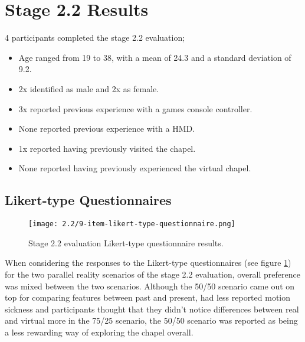 
\section{Stage 2.2 Results}

4 participants completed the stage 2.2 evaluation;
\begin{itemize}
	\item Age ranged from 19 to 38, with a mean of 24.3 and a standard deviation of 9.2.
	\item 2x identified as male and 2x as female.
	\item 3x reported previous experience with a games console controller.
	\item None reported previous experience with a HMD.
	\item 1x reported having previously visited the chapel.
	\item None reported having previously experienced the virtual chapel.
\end{itemize}


\subsection{Likert-type Questionnaires}

\begin{figure}[h]
	\begin{center}
	\texttt{[image: 2.2/9-item-likert-type-questionnaire.png]}
	\caption{Stage 2.2 evaluation Likert-type questionnaire results.}
	\label{9-item-likert-type-questionnaire.png}
	\end{center}
\end{figure}

When considering the responses to the Likert-type questionnaires (see figure \ref{9-item-likert-type-questionnaire.png}) for the two parallel reality scenarios of the stage 2.2 evaluation, overall preference was mixed between the two scenarios. Although the 50/50 scenario came out on top for comparing features between past and present, had less reported motion sickness and participants thought that they didn't notice differences between real and virtual more in the 75/25 scenario, the 50/50 scenario was reported as being a less rewarding way of exploring the chapel overall.

